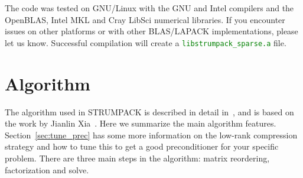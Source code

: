 \documentclass{article}
\newcommand{\tm}{\textsuperscript{\textregistered}}
\begin{document}
The code was tested on GNU/Linux with the GNU and Intel\tm{} compilers
and the OpenBLAS, Intel\tm{} MKL\tm{} and Cray\tm{} LibSci\tm{}
numerical libraries. If you encounter issues on other platforms or
with other BLAS/LAPACK implementations, please let us know.
Successful compilation will create a \textcolor{green}{\texttt{libstrumpack\_sparse.a}} file.


\section{Algorithm}\label{sec:algo}
The algorithm used in STRUMPACK is described in detail
in~\cite{ghysels2015sparse}, and is based on the work by Jianlin
Xia~\cite{xia2013randomized}. Here we summarize the main algorithm
features. Section~\ref{sec:tune_prec} has some more information on the
low-rank compression strategy and how to tune this to get a good
preconditioner for your specific problem. There are three main steps
in the algorithm: matrix reordering, factorization and solve.
\end{document}
